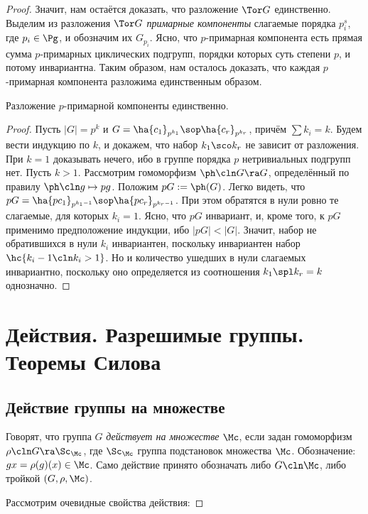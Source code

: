 \documentclass[a4paper]{article}
\begin{document}
\begin{proof}
Значит, нам остаётся доказать, что разложение $\Tor G$ единственно. Выделим  из разложения $\Tor G$
\emph{примарные компоненты} слагаемые порядка $p_i^s$, где $p_i \in \Pg$, и обозначим их $G_{p_i}$. Ясно,
что $p$-примарная компонента есть прямая сумма $p$-примарных циклических подгрупп, порядки которых суть
степени $p$, и потому инвариантна. Таким образом, нам осталось доказать, что каждая $p$-примарная компонента
разложима единственным образом.

\begin{theorem}[О единственности]
Разложение $p$-примарной компоненты единственно.
\end{theorem}
\begin{proof}
Пусть $|G|=p^k$ и $G=\ha{c_1}_{p^{k_1}}\sop \ha{c_r}_{p^{k_r}}$, причём  $\sum k_i = k$. Будем вести индукцию
по $k$, и докажем, что набор $k_1\sco k_r$ не зависит от разложения. При $k=1$ доказывать нечего, ибо в
группе порядка $p$ нетривиальных подгрупп нет. Пусть $k>1$. Рассмотрим гомоморфизм $\ph\cln G \ra G$,
определённый по правилу $\ph\cln g \mapsto pg$. Положим $pG := \ph(G)$. Легко видеть, что
$pG=\ha{pc_1}_{p^{k_1-1}}\sop \ha{pc_r}_{p^{k_r-1}}$. При этом обратятся в нули ровно те слагаемые, для
которых $k_i=1$. Ясно, что $pG$ инвариант, и, кроме того, к $pG$ применимо предположение индукции, ибо
$|pG|<|G|$. Значит, набор не обратившихся в нули $k_i$ инвариантен, поскольку инвариантен набор
$\hc{k_i-1\cln k_i > 1}$. Но и количество ушедших в нули слагаемых инвариантно, поскольку оно определяется из соотношения
$k_1 \spl k_r=k$ однозначно.
\end{proof}


\section{Действия. Разрешимые группы. Теоремы Силова}

\subsection{Действие группы на множестве}

\begin{df}
Говорят, что группа $G$ \emph{действует на множестве} $\Mc$, если задан  гомоморфизм $\rho\cln G \ra
\Sc_\Mc$, где $\Sc_\Mc$ группа подстановок множества $\Mc$. Обозначение: $gx = \rho(g)(x) \in \Mc$. Само
действие принято обозначать либо $G\cln\Mc$, либо тройкой $(G, \rho, \Mc)$.
\end{df}

Рассмотрим очевидные свойства действия:


\end{proof}
\end{document}
